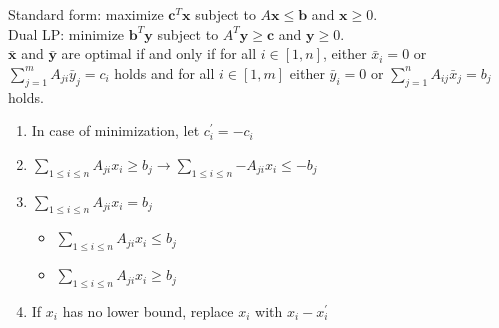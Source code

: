 Standard form: maximize $\mathbf{c}^T\mathbf{x}$ subject to $A\mathbf{x} \leq \mathbf{b}$ and $\mathbf{x} \geq 0$. \\
Dual LP: minimize $\mathbf{b}^T\mathbf{y}$ subject to $A^T\mathbf{y} \geq \mathbf{c}$ and $\mathbf{y} \geq 0$. \\
$\bar{\mathbf{x}}$ and $\bar{\mathbf{y}}$ are optimal if and only if for all $i \in [1, n]$, either $\bar{x}_i = 0$ or $\sum_{j=1}^{m}A_{ji}\bar{y}_j = c_i$ holds and for all $i \in [1, m]$ either $\bar{y}_i = 0$ or $\sum_{j=1}^{n}A_{ij}\bar{x}_j = b_j$ holds.

\begin{enumerate}
    \itemsep-0.5em
    \item In case of minimization, let $c^\prime_i = -c_i$
    \item $\sum_{1 \leq i \leq n}{A_{ji}x_i} \geq b_j \rightarrow \sum_{1 \leq i \leq n}{-A_{ji}x_i} \leq -b_j$
    \item $\sum_{1 \leq i \leq n}{A_{ji}x_i} = b_j$ 
        \vspace{-0.5em}
        \begin{itemize}
            \itemsep-0.5em
            \item $\sum_{1 \leq i \leq n}{A_{ji}x_i} \leq b_j$
            \item $\sum_{1 \leq i \leq n}{A_{ji}x_i} \geq b_j$
        \end{itemize}
    \item If $x_i$ has no lower bound, replace $x_i$ with $x_i - x_i^\prime$
\end{enumerate}